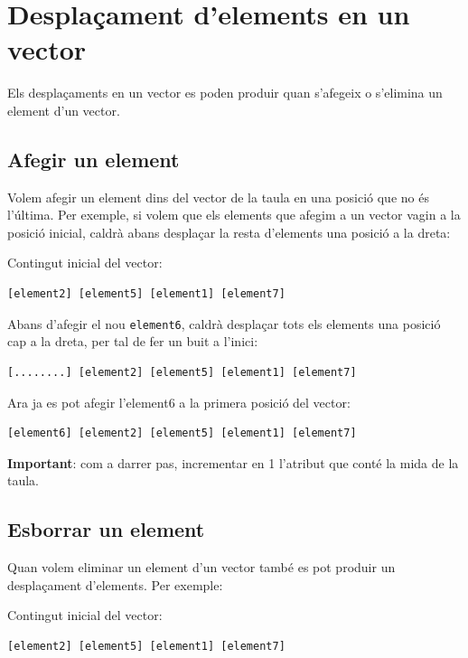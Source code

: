 \documentclass[]{book}
\begin{document}
\section{Desplaçament d'elements en un
vector}\label{desplacament-delements-en-un-vector}

Els desplaçaments en un vector es poden produir quan s'afegeix o
s'elimina un element d'un vector.

\subsection{Afegir un element}\label{afegir-un-element}

Volem afegir un element dins del vector de la taula en una posició que
no és l'última. Per exemple, si volem que els elements que afegim a un
vector vagin a la posició inicial, caldrà abans desplaçar la resta
d'elements una posició a la dreta:

Contingut inicial del vector:

\begin{verbatim}
[element2] [element5] [element1] [element7]
\end{verbatim}

Abans d'afegir el nou \texttt{element6}, caldrà desplaçar tots els
elements una posició cap a la dreta, per tal de fer un buit a l'inici:

\begin{verbatim}
[........] [element2] [element5] [element1] [element7]
\end{verbatim}

Ara ja es pot afegir l'element6 a la primera posició del vector:

\begin{verbatim}
[element6] [element2] [element5] [element1] [element7]
\end{verbatim}

\textbf{Important}: com a darrer pas, incrementar en 1 l'atribut que
conté la mida de la taula.

\subsection{Esborrar un element}\label{esborrar-un-element}

Quan volem eliminar un element d'un vector també es pot produir un
desplaçament d'elements. Per exemple:

Contingut inicial del vector:

\begin{verbatim}
[element2] [element5] [element1] [element7]
\end{verbatim}
\end{document}
